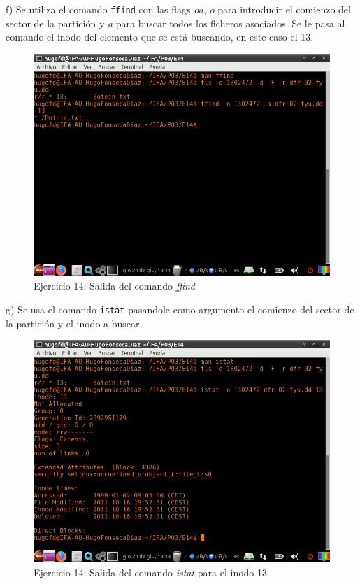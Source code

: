 \documentclass[11pt]{article}
\begin{document}
f) Se utiliza el comando \verb|ffind| con las flags \textit{oa}, \textit{o} para introducir el comienzo del sector de la partición y \textit{a} para buscar todos los ficheros asociados. Se le pasa al comando el inodo del elemento que se está buscando, en este caso el 13.

\begin{figure}[H]
    \caption{Ejercicio 14: Salida del comando \textit{ffind}}
    \centering
    \includegraphics[scale=0.7]{p03/e14-5.png}
\end{figure}

g) Se usa el comando \verb|istat| pasandole como argumento el comienzo del sector de la partición y el inodo a buscar.

\begin{figure}[H]
    \caption{Ejercicio 14: Salida del comando \textit{istat} para el inodo 13}
    \centering
    \includegraphics[scale=0.7]{p03/e14-6.png}
\end{figure}
\end{document}
